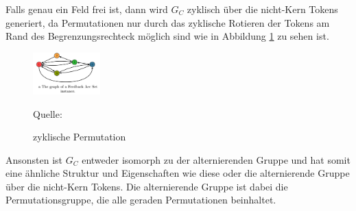 \documentclass[seminar,german]{algothesis}
\newcommand*{\quelle}{%
  \footnotesize Quelle:
}
\begin{document}
\noindent
Falls genau ein Feld frei ist, dann wird $G_C$ zyklisch über die nicht-Kern Tokens generiert, da Permutationen nur durch das zyklische Rotieren der Tokens am Rand des Begrenzungsrechteck möglich sind wie in Abbildung \ref{fig:16} zu sehen ist.

\begin{figure}[ht]
	\centering
	\includegraphics[width=0.23\textwidth]{graph}
	\caption{zyklische Permutation}
	\quelle\cite{akitaya2022pushing}
	\label{fig:16}
\end{figure}

\noindent
Ansonsten ist $G_C$ entweder isomorph zu der alternierenden Gruppe und hat somit eine ähnliche Struktur und Eigenschaften wie diese oder die alternierende Gruppe über die nicht-Kern Tokens. 
Die alternierende Gruppe ist dabei die Permutationsgruppe, die alle geraden Permutationen beinhaltet.
\end{document}
